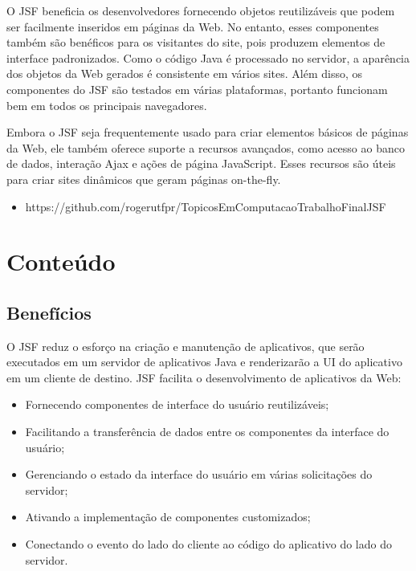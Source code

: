 \documentclass[	DIV=calc,%
							paper=a4,%
							fontsize=12pt,%
							onecolumn]{scrartcl}	 					%
\begin{document}
O JSF beneficia os desenvolvedores fornecendo objetos reutilizáveis que podem ser facilmente inseridos em páginas da Web. No entanto, esses componentes também são benéficos para os visitantes do site, pois produzem elementos de interface padronizados. Como o código Java é processado no servidor, a aparência dos objetos da Web gerados é consistente em vários sites. Além disso, os componentes do JSF são testados em várias plataformas, portanto funcionam bem em todos os principais navegadores.

Embora o JSF seja frequentemente usado para criar elementos básicos de páginas da Web, ele também oferece suporte a recursos avançados, como acesso ao banco de dados, interação Ajax e ações de página JavaScript. Esses recursos são úteis para criar sites dinâmicos que geram páginas on-the-fly.


\begin{itemize}
	\item https://github.com/rogerutfpr/TopicosEmComputacao\underline{\hspace{.10in}}TrabalhoFinal\underline{\hspace{.10in}}JSF
\end{itemize}



\section{Conteúdo}


\subsection{Benefícios}

O JSF reduz o esforço na criação e manutenção de aplicativos, que serão executados em um servidor de aplicativos Java e renderizarão a UI do aplicativo em um cliente de destino. JSF facilita o desenvolvimento de aplicativos da Web:
\begin{itemize}
\item Fornecendo componentes de interface do usuário reutilizáveis;
\item Facilitando a transferência de dados entre os componentes da interface do usuário;
\item Gerenciando o estado da interface do usuário em várias solicitações do servidor;
\item Ativando a implementação de componentes customizados;
\item Conectando o evento do lado do cliente ao código do aplicativo do lado do servidor.
\end{itemize}
\end{document}
